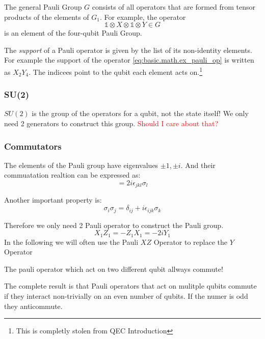 The general Pauli Group $G$ consists of all operators that are formed from tensor products of the elements of $G_1$. 
For example, the operator
\begin{equation}
    \mathds{1} \otimes X \otimes \mathds{1} \otimes Y \in G
    \label{eq:basic.math.ex_pauli_op}
\end{equation}
is an element of the four-qubit Pauli Group. 

The \textit{support} of a Pauli operator is given by the list of its non-identity elements.
For example the support of the operator \ref{eq:basic.math.ex_pauli_op} is written as $X_2Y_4$.
The indicees point to the qubit each element acts on.\footnote{This is completly stolen from QEC Introduction}


\subsubsection{SU(2)}
$SU(2)$ is the group of the operators for a qubit, not the state itself!
We only need 2 generators to construct this group.
\textcolor{red}{Should I care about that?}

\subsubsection{Commutators}
The elements of the Pauli group have eigenvalues ${\pm 1,\pm i}$.
And their commuatation realtion can be expressed as:
\begin{equation}
    [\sigma_j,\sigma_k] = 2 i \epsilon_{jkl} \sigma_l
\end{equation}

Another important property is:
\begin{equation}
    \sigma_i \sigma_j = \delta_{ij} + i \epsilon_{ijk} \sigma_k
\end{equation}

Therefore we only need 2 Pauli operator to construct the Pauli group.
\begin{equation}
    X_1 Z_1 = - Z_1 X_1 = -2 i Y_1
\end{equation}
In the following we will often use the Pauli $XZ$ Operator to replace the $Y$ Operator 

The pauli operator which act on two different qubit allways commute!

The complete result is that Pauli operators that act on mulitple qubits commute if they interact non-trivially on an even number of qubits.
If the numer is odd they anticommute.

